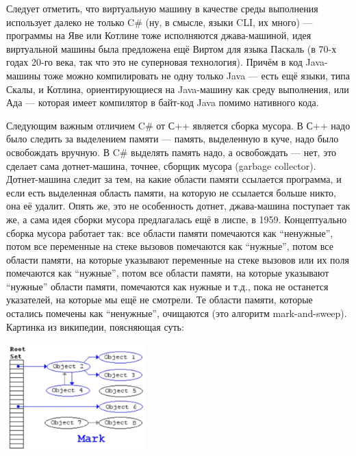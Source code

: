 \documentclass[a5paper]{article}
\begin{document}
Следует отметить, что виртуальную машину в качестве среды выполнения использует далеко не только C\# (ну, в смысле, языки CLI, их много) --- программы на Яве или Котлине тоже исполняются джава-машиной, идея виртуальной машины была предложена ещё Виртом для языка Паскаль (в 70-х годах 20-го века, так что это не суперновая технология). Причём в код Java-машины тоже можно компилировать не одну только Java --- есть ещё языки, типа Скалы, и Котлина, ориентирующиеся на Java-машину как среду выполнения, или Ада --- которая имеет компилятор в байт-код Java помимо нативного кода.

Следующим важным отличием C\# от С++ является сборка мусора. В С++ надо было следить за выделением памяти --- память, выделенную в куче, надо было освобождать вручную. В C\# выделять память надо, а освобождать --- нет, это сделает сама дотнет-машина, точнее, сборщик мусора (garbage collector). Дотнет-машина следит за тем, на какие области памяти ссылается программа, и если есть выделенная область памяти, на которую не ссылается больше никто, она её удалит. Опять же, это не особенность дотнет, джава-машина поступает так же, а сама идея сборки мусора предлагалась ещё в лиспе, в 1959. Концептуально сборка мусора работает так: все области памяти помечаются как ``ненужные'', потом все переменные на стеке вызовов помечаются как ``нужные'', потом все области памяти, на которые указывают переменные на стеке вызовов или их поля помечаются как ``нужные'', потом все области памяти, на которые указывают ``нужные'' области памяти, помечаются как нужные и т.д., пока не останется указателей, на которые мы ещё не смотрели. Те области памяти, которые остались помечены как ``ненужные'', очищаются (это алгоритм mark-and-sweep). Картинка из википедии, поясняющая суть:

\begin{center}
	\includegraphics[width=0.4\textwidth]{markAndSweep.png}
\end{center}
\end{document}

